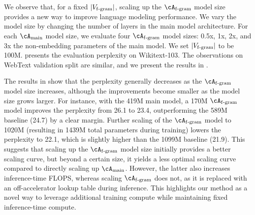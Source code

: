 We observe that, for a fixed $|V_{\mathrm{f\text{-}gram}}|$, scaling up the $\Afgram$ model size provides a new way to improve language modeling performance. We vary the model size by changing the number of layers in the main model architecture. For each $\Amain$ model size, we evaluate four $\Afgram$ model sizes: 0.5x, 1x, 2x, and 3x the non-embedding parameters of the main model. We set $|V_{\mathrm{f\text{-}gram}}|$ to be 100M.  presents the evaluation perplexity on Wikitext-103. The observations on WebText validation split are similar, and we present the results in .

The results in  show that the perplexity generally decreases as the $\Afgram$ model size increases, although the improvements become smaller as the model size grows larger. For instance, with the 419M main model, a 170M $\Afgram$ model improves the perplexity from 26.1 to 23.4, outperforming the 589M baseline (24.7) by a clear margin. Further scaling of the $\Afgram$ model to 1020M (resulting in 1439M total parameters during training) lowers the perplexity to 22.1, which is slightly higher than the 1099M baseline (21.9). This suggests that scaling up the $\Afgram$ model size initially provides a better scaling curve, but beyond a certain size, it yields a less optimal scaling curve compared to directly scaling up $\Amain$. However, the latter also increases inference-time FLOPS, whereas scaling $\Afgram$ does not, as it is replaced with an off-accelerator lookup table during inference. This highlights our method as a novel way to leverage additional training compute while maintaining fixed inference-time compute.
